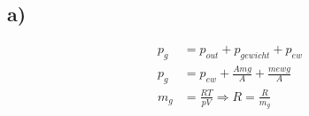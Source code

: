

\subsection*{a)}
\begin{align*}
    p_g &= p_{out} + p_{gewicht} + p_{ew} \\
    p_g &= p_{ew} + \frac{A m g}{A} + \frac{m e w g}{A} \\
    m_g &= \frac{RT}{pV} \Rightarrow R = \frac{R}{m_g}
\end{align*}